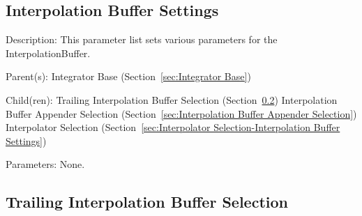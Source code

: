 \subsection{Interpolation Buffer Settings}
\label{sec:Interpolation Buffer Settings}

\begin{list}{}
  {\setlength{\leftmargin}{1.0in}
   \setlength{\labelwidth}{0.75in}
   \setlength{\labelsep}{0.125in}}
  \item[Description:]
    This parameter list sets various parameters for the InterpolationBuffer.
  \item[Parent(s):]
    Integrator Base (Section~\ref{sec:Integrator Base})
  \item[Child(ren):]
    Trailing Interpolation Buffer Selection (Section~\ref{sec:Trailing Interpolation Buffer Selection})
      \newline 
    Interpolation Buffer Appender Selection (Section~\ref{sec:Interpolation Buffer Appender Selection})
      \newline 
    Interpolator Selection (Section~\ref{sec:Interpolator Selection-Interpolation Buffer Settings})
  \item[Parameters:]
    None. 
\end{list}

\subsection{Trailing Interpolation Buffer Selection}
\label{sec:Trailing Interpolation Buffer Selection}

